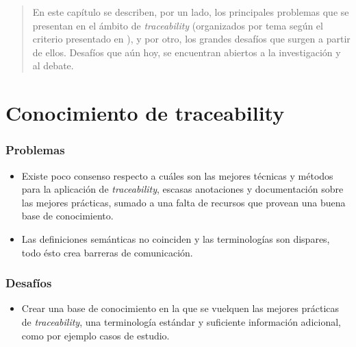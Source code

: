 \documentclass[a4paper,12pt,oneside,spanish]{book}
\begin{document}
\begin{quotation}
En este capítulo se describen, por un lado, los principales problemas que se presentan en el ámbito de \textit{traceability} (organizados por tema según el criterio presentado en \cite{Excellence}), y por otro, los grandes desafíos que surgen a partir de ellos. Desafíos que aún hoy, se encuentran abiertos a la investigación y al debate.
\end{quotation}


\bigskip


\minitoc 


\pagebreak


\section{Conocimiento de traceability}

\subsubsection{Problemas}

\begin{itemize}[label={$\times$}]

\item Existe poco consenso respecto a cuáles son las mejores técnicas y métodos para la aplicación de \textit{traceability}, escasas anotaciones y documentación sobre las mejores prácticas, sumado a una falta de recursos que provean una buena base de conocimiento.

\item Las definiciones semánticas no coinciden y las terminologías son dispares, todo ésto crea barreras de comunicación.

\end{itemize}

\subsubsection{Desafíos}

\begin{itemize}[label={\checkmark}]

\item Crear una base de conocimiento en la que se vuelquen las mejores prácticas de \textit{traceability}, una terminología estándar y suficiente información adicional, como por ejemplo casos de estudio.

\end{itemize}
\end{document}
